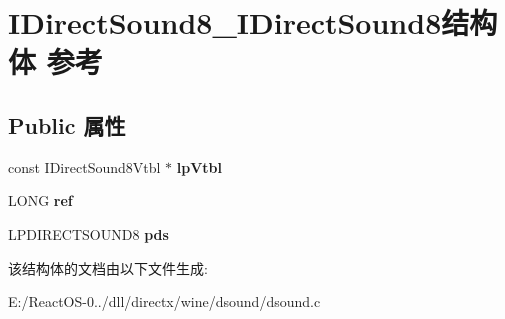 \hypertarget{struct_i_direct_sound8___i_direct_sound8}{}\section{I\+Direct\+Sound8\+\_\+\+I\+Direct\+Sound8结构体 参考}
\label{struct_i_direct_sound8___i_direct_sound8}
\subsection*{Public 属性}
\begin{DoxyCompactItemize}
\item 
\mbox{\label{struct_i_direct_sound8___i_direct_sound8_aaf985903662392b13e92eeac65acf5a9}} 
const I\+Direct\+Sound8\+Vtbl $\ast$ {\bfseries lp\+Vtbl}
\item 
\mbox{\label{struct_i_direct_sound8___i_direct_sound8_a68dd894f761a0078f38a65635da2d8d2}} 
L\+O\+NG {\bfseries ref}
\item 
\mbox{\label{struct_i_direct_sound8___i_direct_sound8_a5b5b12b38da27b8af4192b2fedf26a31}} 
L\+P\+D\+I\+R\+E\+C\+T\+S\+O\+U\+N\+D8 {\bfseries pds}
\end{DoxyCompactItemize}


该结构体的文档由以下文件生成\+:\begin{DoxyCompactItemize}
\item 
E\+:/\+React\+O\+S-\/0../dll/directx/wine/dsound/dsound.\+c\end{DoxyCompactItemize}
